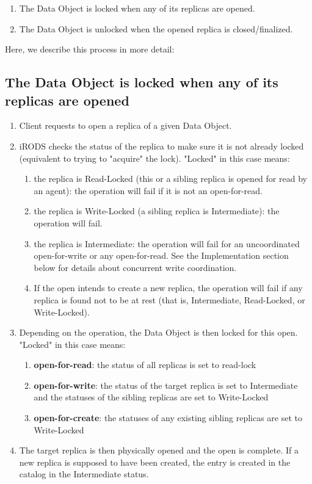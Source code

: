 \documentclass{irodsugm}
\begin{document}
\begin{enumerate}
\item The Data Object is locked when any of its replicas are opened.
\item The Data Object is unlocked when the opened replica is closed/finalized.
\end{enumerate}

Here, we describe this process in more detail:

\subsection*{The Data Object is locked when any of its replicas are opened}

\begin{enumerate}
\item Client requests to open a replica of a given Data Object.
\item iRODS checks the status of the replica to make sure it is not already locked (equivalent to trying to "acquire" the lock). "Locked" in this case means:
   \begin{enumerate}
   \item the replica is Read-Locked (this or a sibling replica is opened for read by an agent): the operation will fail if it is not an open-for-read.
   \item the replica is Write-Locked (a sibling replica is Intermediate): the operation will fail.
   \item the replica is Intermediate: the operation will fail for an uncoordinated open-for-write or any open-for-read. See the Implementation section below for details about concurrent write coordination.
   \item If the open intends to create a new replica, the operation will fail if any replica is found not to be at rest (that is, Intermediate, Read-Locked, or Write-Locked).
   \end{enumerate}
\item Depending on the operation, the Data Object is then locked for this open. "Locked" in this case means:
   \begin{enumerate}
   \item \textbf{open-for-read}: the status of all replicas is set to read-lock
   \item \textbf{open-for-write}: the status of the target replica is set to Intermediate and the statuses of the sibling replicas are set to Write-Locked
   \item \textbf{open-for-create}: the statuses of any existing sibling replicas are set to Write-Locked
   \end{enumerate}
\item The target replica is then physically opened and the open is complete. If a new replica is supposed to have been created, the entry is created in the catalog in the Intermediate status.
\end{enumerate}
\end{document}
